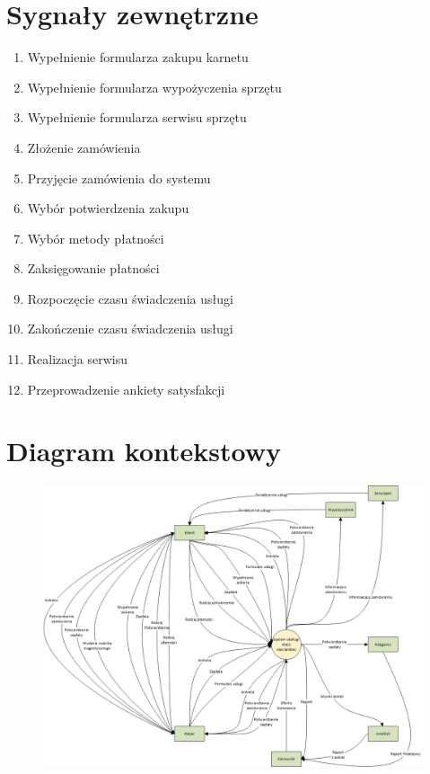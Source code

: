 \documentclass{article}
\begin{document}
\newpage

\section{Sygnały zewnętrzne}
\begin{enumerate}
\item Wypełnienie formularza zakupu karnetu
\item Wypełnienie formularza wypożyczenia sprzętu
\item Wypełnienie formularza serwisu sprzętu
\item Złożenie zamówienia
\item Przyjęcie zamówienia do systemu
\item Wybór potwierdzenia zakupu
\item Wybór metody płatności
\item Zaksięgowanie płatności
\item Rozpoczęcie czasu świadczenia usługi
\item Zakończenie czasu świadczenia usługi
\item Realizacja serwisu
\item Przeprowadzenie ankiety satysfakcji
\end{enumerate}

\newpage
\section{Diagram kontekstowy}

\begin{figure}[h]
\includegraphics[scale=0.65]{diagram_kontekstowy.png}
\label{fig: diagram kontekstowy}
\end{figure}
\end{document}
